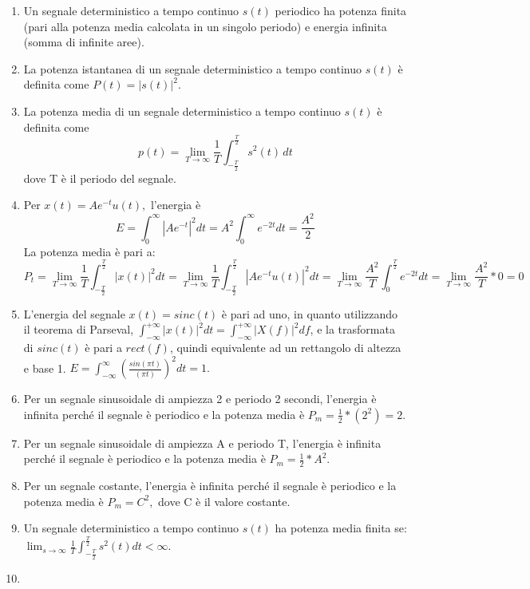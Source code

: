 \documentclass[
  paper=a4,
  ,captions=tableheading
]{scrartcl}
\begin{document}
\begin{enumerate}
\def\labelenumi{\arabic{enumi}.}
\item
  Un segnale deterministico a tempo continuo \(s(t)\) periodico ha
  potenza finita (pari alla potenza media calcolata in un singolo
  periodo) e energia infinita (somma di infinite aree).
\item
  La potenza istantanea di un segnale deterministico a tempo continuo
  \(s(t)\) è definita come \(P(t) = |s(t)|^2\).
\item
  La potenza media di un segnale deterministico a tempo continuo
  \(s(t)\) è definita come \[
  p(t) = \lim_{T\to\infty} \frac{1}{T} \int_{-\frac{T}{2}}^{\frac{T}{2}} s^2(t) \,dt
  \] dove T è il periodo del segnale.
\item
  Per \(x(t) = Ae^{-t}u(t),\) l'energia è \[
  E = \int_{0}^{\infty} |Ae^{-t}|^2 dt = A^2 \int_0^\infty e^{-2t} dt = \frac{A^2}{2}
  \] La potenza media è pari a: \[
  \displaystyle P_t = \lim_{T \to \infty} \frac{1}{T} \int_{-\frac{T}{2}}^{\frac{T}{2}} |x(t)|^2 dt = \lim_{T \to \infty} \frac{1}{T} \int_{-\frac{T}{2}}^{\frac{T}{2}} |A e^{-t} u(t)|^2 dt =  \lim_{T \to \infty} \frac{A^2}{T} \int_{0}^{\frac{T}{2}} e^{-2t} dt = \lim_{T \to \infty} \frac{A^2}{T}*0 = 0
  \]
\item
  L'energia del segnale \(x(t) = sinc(t)\) è pari ad uno, in quanto
  utilizzando il teorema di Parseval,
  \(\displaystyle\int_{-\infty}^{+\infty}|x(t)|^2dt = \int_{-\infty}^{+\infty}|X(f)|^2df\),
  e la trasformata di \(sinc(t)\) è pari a \(rect(f)\), quindi
  equivalente ad un rettangolo di altezza e base 1.
  \(\displaystyle E = \int_{-\infty}^\infty (\frac{sin(\pi t)}{( \pi t)})^2 dt = 1.\)
\item
  Per un segnale sinusoidale di ampiezza 2 e periodo 2 secondi,
  l'energia è infinita perché il segnale è periodico e la potenza media
  è \(P_m = \frac{1}{2} * (2^2) = 2.\)
\item
  Per un segnale sinusoidale di ampiezza A e periodo T, l'energia è
  infinita perché il segnale è periodico e la potenza media è
  \(P_m = \frac{1}{2} * A^2\).
\item
  Per un segnale costante, l'energia è infinita perché il segnale è
  periodico e la potenza media è \(P_m = C^2,\) dove C è il valore
  costante.
\item
  Un segnale deterministico a tempo continuo \(s(t)\) ha potenza media
  finita se:
  \(\displaystyle \lim_{s\to\infty} \frac{1}{T} \int_{-\frac{T}{2}}^{\frac{T}{2}} s^2(t)dt < \infty\).
\item

\end{enumerate}
\end{document}
